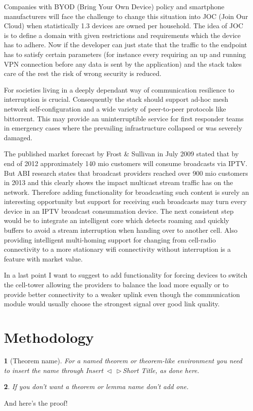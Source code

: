 \documentclass[twocolumn,english]{IEEEtran}
\makeatletter
\DeclareRobustCommand*{\lyxarrow}{%
\@ifstar
{\leavevmode\,$\triangleleft$\,\allowbreak}
{\leavevmode\,$\triangleright$\,\allowbreak}}
\theoremstyle{plain}
\newtheorem{thm}{\protect\theoremname}
\theoremstyle{plain}
\newtheorem{lem}[thm]{\protect\lemmaname}
\providecommand{\lemmaname}{Lemma}
\providecommand{\theoremname}{Theorem}
\makeatother
\begin{document}
Companies with BYOD (Bring Your Own Device) policy and smartphone
manufacturers will face the challenge to change this situation into JOC (Join
Our Cloud) when statistically 1.3 devices are owned per
household\cite{gartner:predicts-2014-cognizant-computing}. The idea of JOC is
to define a domain with given restrictions and requirements which the device
has to adhere. Now if the developer can just state that the traffic to the
endpoint has to satisfy certain parameters (for instance every requiring an up
and running VPN connection before any data is sent by the application) and the
stack takes care of the rest the risk of wrong security is reduced.

For societies living in a deeply dependant way of communication resilience to
interruption is crucial. Consequently the stack should support ad-hoc mesh
network self-configuration and a wide variety of peer-to-peer protocols like
bittorrent. This may provide an uninterruptible service for first responder
teams in emergency cases where the prevailing infrastructure collapsed or was
severely damaged.

The published market forecast by Frost \& Sullivan in July
2009\cite{frost:iptv-market} stated that by end of 2012 approximately 140 mio
customers will consume broadcasts via IPTV. But ABI research states that
broadcast providers reached over 900 mio customers in
2013\cite{abi:iptv-marketshare} and this clearly shows the impact multicast
stream traffic has on the network.  Therefore adding functionality for
broadcasting such content is surely an interesting opportunity but support for
receiving such broadcasts may turn every device in an IPTV broadcast
consummation device. The next consistent step would be to integrate an
intelligent core which detects roaming and quickly buffers to avoid a stream
interruption when handing over to another cell. Also providing intelligent
multi-homing support for changing from cell-radio connectivity to a more
stationary wifi connectivity without interruption is a feature with market
value.

In a last point I want to suggest to add functionality for forcing devices to
switch the cell-tower allowing the providers to balance the load more equally
or to provide better connectivity to a weaker uplink even though the
communication module would usually choose the strongest signal over good link
quality.

\section{Methodology}
\begin{thm}[Theorem name]
For a named theorem or theorem-like environment you need to insert
the name through \textsf{Insert\lyxarrow{}Short Title}, as done here.\end{thm}
\begin{lem}
If you don't want a theorem or lemma name don't add one.\end{lem}
\begin{IEEEproof}
And here's the proof!
\end{IEEEproof}
\end{document}
